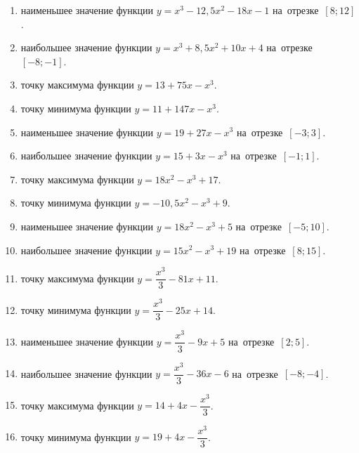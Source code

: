 \documentclass[a4paper,10pt]{article}
\begin{document}
\begin{enumerate}
\item {} наименьшее значение функции $y=x^3 -12,5x^2-18x-1$ на~отрезке~$\left[8;12\right]$.

\item {} наибольшее значение функции $y=x^3 +8,5x^2+10x+4$ на~отрезке~$\left[-8;-1\right]$.

\item {} точку максимума функции $y=13+75x-x^3$.

\item {} точку минимума функции $y=11+147x-x^3$.

\item {} наименьшее значение функции $y=19+27x-x^3$ на~отрезке~$\left[-3;3\right]$.

\item {} наибольшее значение функции $y=15+3x-x^3$ на~отрезке~$\left[-1;1\right]$.

\item {} точку максимума функции $y=18x^2-x^3+17$.

\item {} точку минимума функции $y=-10,5x^2-x^3+9$.

\item {} наименьшее значение функции $y=18x^2-x^3+5$ на~отрезке~$\left[-5;10\right]$.

\item {} наибольшее значение функции $y=15x^2-x^3+19$ на~отрезке~$\left[8;15\right]$.

\item {} точку максимума функции $y=\dfrac{x^3}{3} -81x+11$.

\item {} точку минимума функции $y=\dfrac{x^3}{3} -25x+14$.

\item {} наименьшее значение функции $y=\dfrac{x^3}{3} -9x+5$ на~отрезке~$\left[2;5\right]$.

\item {} наибольшее значение функции $y=\dfrac{x^3}{3} -36x-6$ на~отрезке~$\left[-8;-4\right]$.

\item {} точку максимума функции $y=14 +4x-\dfrac{x^3}{3}$.

\item {} точку минимума функции $y=19 +4x-\dfrac{x^3}{3}$.


\end{enumerate}
\end{document}
